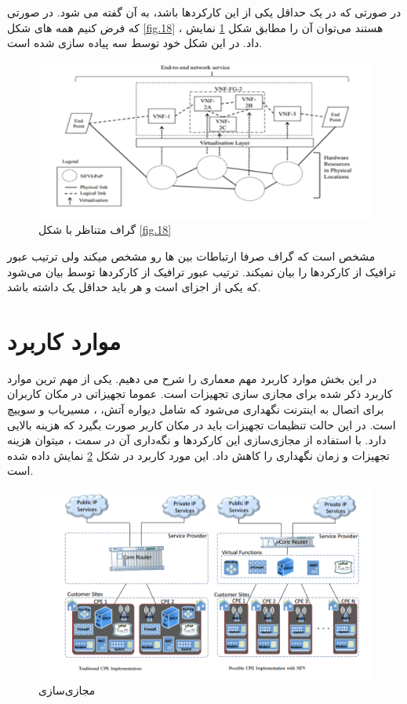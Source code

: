 در صورتی که در یک   حداقل یکی از این کارکردها  باشد، به آن  گفته می شود.
در صورتی که فرض کنیم همه  های شکل
\ref{fig.18}
،  هستند می‌توان آن را مطابق شکل
\ref{fig.19}
نمایش داد.
در این شکل  خود توسط سه  پیاده سازی شده است.

\begin{figure}[h!]
\center\includegraphics[scale=.5]{images/vnf-fg}
\caption{گراف  متناظر با شکل \ref{fig.18}}
\label{fig.19}
\end{figure}

مشخص است که گراف  صرفا ارتباطات بین ‌ها رو مشخص میکند ولی ترتیب عبور ترافیک از کارکردها را بیان نمیکند.
ترتیب عبور ترافیک از کارکردها توسط  بیان می‌شود که یکی از اجزای  است و هر  باید حداقل یک  داشته باشد.

\section{موارد کاربرد}
در این بخش موارد کاربرد مهم معماری  را شرح می دهیم.
یکی از مهم ترین موارد کاربرد ذکر شده برای  مجازی سازی تجهیزات  است.
عموما تجهیزاتی در مکان کاربران برای اتصال به اینترنت نگهداری می‌شود که شامل دیواره آتش، ، مسیریاب و سوییچ است.
در این حالت تنظیمات تجهیزات باید در مکان کاربر صورت بگیرد که هزینه بالایی دارد.
با استفاده از مجازی‌سازی این کارکردها و نگه‌داری آن در سمت ، میتوان هزینه تجهیزات و زمان نگهداری را کاهش داد.
این مورد کاربرد در شکل \ref{fig.20} نمایش داده شده است.

\begin{figure}[h!]
\center\includegraphics[scale=.5]{images/cpe}
\caption{مجازی‌سازی }
\label{fig.20}
\end{figure}

